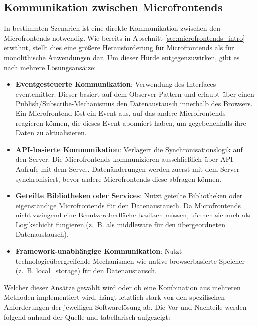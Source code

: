 \subsection{Kommunikation zwischen Microfrontends} \label{sec:communication_mf}
In bestimmten Szenarien ist eine direkte Kommunikation zwischen den Microfrontends notwendig. Wie bereits in Abschnitt \ref{sec:microfrontends_intro} erwähnt, stellt dies eine größere Herausforderung für Microfrontends als für monolithische Anwendungen dar.
Um dieser Hürde entgegenzuwirken, gibt es nach \cite[Kap.~4]{microservices_state_management} mehrere Lösungsansätze:
\begin{itemize}
  \item \textbf{Eventgesteuerte Kommunikation}: Verwendung des \gls{Interface}s \gls{eventemitter}. Dieser basiert auf dem Observer-Pattern und erlaubt über einen Publish/Subscribe-Mechanismus den Datenaustausch innerhalb des Browsers. Ein Microfrontend löst ein Event aus, auf das andere Microfrontends reagieren können, die dieses Event abonniert haben, um gegebenenfalls ihre Daten zu aktualisieren.
  \item \textbf{API-basierte Kommunikation}: Verlagert die Synchronisationslogik auf den Server. Die Microfrontends kommunizieren ausschließlich über API-Aufrufe mit dem Server. Datenänderungen werden zuerst mit dem Server synchronisiert, bevor andere Microfrontends diese abfragen können.
  \item \textbf{Geteilte Bibliotheken oder Services}: Nutzt geteilte Bibliotheken oder eigenständige Microfrontends für den Datenaustausch. Da Microfrontends nicht zwingend eine Benutzeroberfläche besitzen müssen, können sie auch als Logikschicht fungieren (z.~B. als \gls{middleware} für den übergeordneten Datenaustausch).
  \item \textbf{Framework-unabhängige Kommunikation}: Nutzt technologieübergreifende Mechanismen wie native browserbasierte Speicher (z.~B. \gls{local_storage}) für den Datenaustausch.
\end{itemize}
Welcher dieser Ansätze gewählt wird oder ob eine Kombination aus mehreren Methoden implementiert wird,
hängt letztlich stark von den spezifischen Anforderungen der jeweiligen Softwarelösung ab.
Die Vor-und Nachteile werden folgend anhand der Quelle \cite[Kap.~3, Kap.~4]{perera2023enhancing} und \cite[Kap.~3, Kap.~4]{inproceedings} tabellarisch aufgezeigt:


